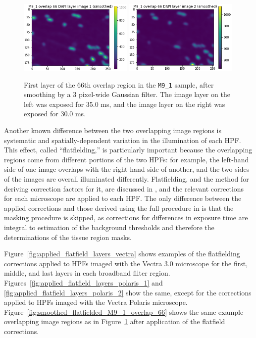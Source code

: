 \documentclass[letterpaper,11pt]{article}
\newcommand{\reffig}[1]{Figure~\ref{#1}}
\begin{document}
\begin{figure}[!ht]
\centering
\includegraphics[width=0.49\textwidth]{images/methods/smoothed_M9_1_overlap_66_dapi_image_1}
\includegraphics[width=0.49\textwidth]{images/methods/smoothed_M9_1_overlap_66_dapi_image_2}
\caption{\footnotesize First layer of the 66th overlap region in the \texttt{M9\_1} sample, after smoothing by a 3 pixel-wide Gaussian filter. The image layer on the left was exposed for 35.0 ms, and the image layer on the right was exposed for 30.0 ms.}
\label{fig:smoothed_M9_1_overlap_66}
\end{figure}

Another known difference between the two overlapping image regions is systematic and spatially-dependent variation in the illumination of each HPF. This effect, called ``flatfielding,'' is particularly important because the overlapping regions come from different portions of the two HPFs: for example, the left-hand side of one image overlaps with the right-hand side of another, and the two sides of the images are overall illuminated differently. Flatfielding, and the method for deriving correction factors for it, are discussed in \cite{flatfielding_note}, and the relevant corrections for each microscope are applied to each HPF. The only difference between the applied corrections and those derived using the full procedure in \cite{flatfielding_note} is that the masking procedure is skipped, as corrections for differences in exposure time are integral to estimation of the background thresholds and therefore the determinations of the tissue region masks. 

\reffig{fig:applied_flatfield_layers_vectra} shows examples of the flatfielding corrections applied to HPFs imaged with the Vectra 3.0 microscope for the first, middle, and last layers in each broadband filter region. Figures~\ref{fig:applied_flatfield_layers_polaris_1} and \ref{fig:applied_flatfield_layers_polaris_2} show the same, except for the corrections applied to HPFs imaged with the Vectra Polaris microscope. \reffig{fig:smoothed_flatfielded_M9_1_overlap_66} shows the same example overlapping image regions as in \reffig{fig:smoothed_M9_1_overlap_66} after application of the flatfield corrections.
\end{document}
